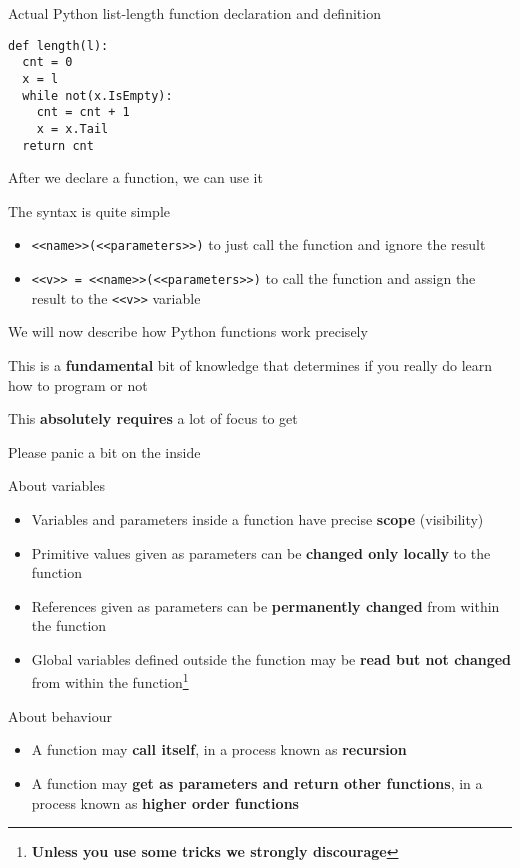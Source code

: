 \documentclass{beamer}
\begin{document}
\begin{frame}[fragile]{Actual Python list-length function declaration and definition}
\begin{lstlisting}
def length(l):
  cnt = 0
  x = l
  while not(x.IsEmpty):
    cnt = cnt + 1
    x = x.Tail
  return cnt  
\end{lstlisting}
\end{frame}

\begin{slide}{
\item After we declare a function, we can use it
\item The syntax is quite simple
\begin{itemize}
\item \texttt{<<name>>(<<parameters>>)} to just call the function and ignore the result
\item \texttt{<<v>> = <<name>>(<<parameters>>)} to call the function and assign the result to the \texttt{<<v>>} variable
\end{itemize}
}\end{slide}

\begin{slide}{
\item We will now describe how Python functions work precisely
\item This is a \textbf{fundamental} bit of knowledge that determines if you really do learn how to program or not
\item This \textbf{absolutely requires} a lot of focus to get
\item Please panic a bit on the inside
}\end{slide}

\begin{slide}{
\item About variables
\begin{itemize}
\item Variables and parameters inside a function have precise \textbf{scope} (visibility)
\item Primitive values given as parameters can be \textbf{changed only locally} to the function
\item References given as parameters can be \textbf{permanently changed} from within the function
\item Global variables defined outside the function may be \textbf{read but not changed} from within the function\footnote{\textbf{Unless you use some tricks we strongly discourage}}
\end{itemize}
\item About behaviour
\begin{itemize}
\item A function may \textbf{call itself}, in a process known as \textbf{recursion}
\item A function may \textbf{get as parameters and return other functions}, in a process known as \textbf{higher order functions}
\end{itemize}
}\end{slide}
\end{document}
